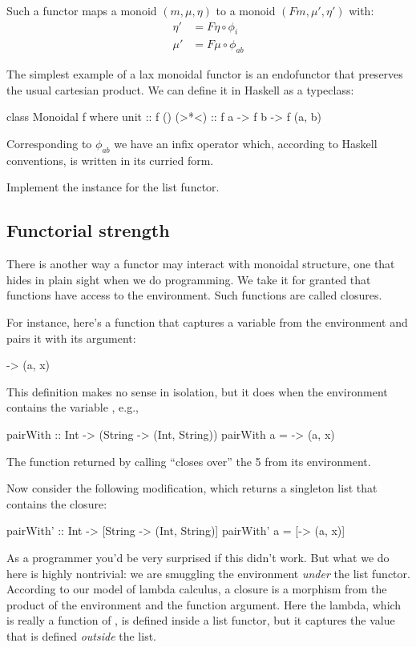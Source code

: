 \documentclass[DaoFP]{subfiles}
\begin{document}
Such a functor maps a monoid $(m, \mu, \eta)$ to a monoid $(F m, \mu', \eta')$ with:
\begin{align*}
\eta' &= F \eta \circ \phi_i \\
\mu' &= F \mu \circ \phi_{a b}
\end{align*}

The simplest example of a lax monoidal functor is an endofunctor that preserves the usual cartesian product. We can define it in Haskell as a typeclass:

\begin{haskell}
class Monoidal f where
  unit  :: f ()
  (>*<) :: f a -> f b -> f (a, b)
\end{haskell}
Corresponding to $\phi_{a b}$ we have an infix operator which, according to Haskell conventions, is written in its curried form.

\begin{exercise}
Implement the  instance for the list functor.
\end{exercise}

\subsection{Functorial strength}

There is another way a functor may interact with monoidal structure, one that hides in plain sight when we do programming. We take it for granted that functions have access to the environment. Such functions are called closures. 

For instance, here's a function that captures a variable  from the environment and pairs it with its argument:
\begin{haskell}
\x -> (a, x)
\end{haskell}
This definition makes no sense in isolation, but it does when the environment contains the variable , e.g.,
\begin{haskell}
pairWith :: Int -> (String -> (Int, String))
pairWith a = \x -> (a, x)
\end{haskell}
The function returned by calling  ``closes over'' the 5 from its environment.

Now consider the following modification, which returns a singleton list that contains the closure:
\begin{haskell}
pairWith' :: Int -> [String -> (Int, String)]
pairWith' a = [\x -> (a, x)]
\end{haskell}
As a programmer you'd be very surprised if this didn't work. But what we do here is highly nontrivial: we are smuggling the environment \emph{under} the list functor. According to our model of lambda calculus, a closure is a morphism from the product of the environment and the function argument. Here the lambda, which is really a function of , is defined inside a list functor, but it captures the value  that is defined \emph{outside} the list.
\end{document}
